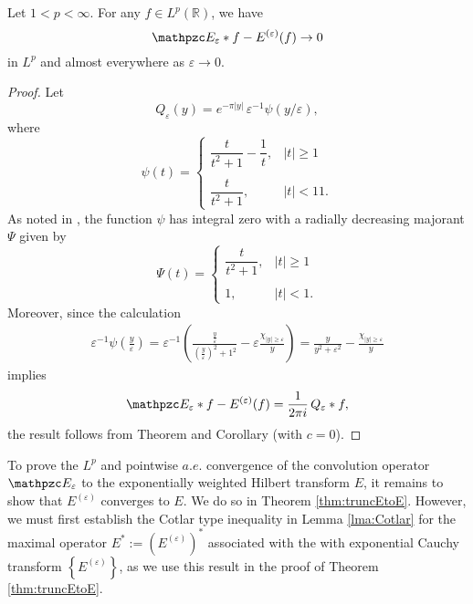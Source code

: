 \documentclass[../dissertation.tex]{subfiles}
\begin{document}
\begin{thm} \label{thm:TruncEepsEquivLim}
	Let $1 < p < \infty$. For any $f \in L^p(\mathbb R)$, we have 
	\[
		\mathpzc E_\varepsilon * f - E^{(\varepsilon)}(f) \to 0
	\]
	in $L^p$ and almost everywhere as $\varepsilon \to 0$. 
\end{thm}
\begin{proof}
	Let
	\[
		Q_\varepsilon(y) = e^{-\pi|y|} \, \varepsilon^{-1} \psi(y/\varepsilon),
	\]
	where 
	\[
		\psi(t) =
			\begin{cases}
				\dfrac{t}{t^2 + 1} - \dfrac{1}{t}, & |t| \geq 1 \\ \\
				\dfrac{t}{t^2 + 1},                & |t| < 1 1.   
			\end{cases}
	\]
	As noted in \cite{Grafakos}, the function $\psi$ has integral zero with 
	a radially decreasing majorant $\Psi$ given by 
	\[
		\Psi(t) =
			\begin{cases}
				\dfrac{t}{t^2 + 1}, & |t| \geq 1 \\ \\
				1,                  & |t| < 1.   
			\end{cases}	
	\]
	Moreover, since the calculation
	\begin{align*}
		\varepsilon^{-1} \psi\left(\frac{y}{\varepsilon}\right)
			= \varepsilon^{-1}
				\left(
					\frac{\frac{y}{\varepsilon}}
						{\left(\frac{y}{\varepsilon}\right)^2+1^2}
					- \varepsilon\frac{\chi_{|y|\geq \varepsilon}}{y}
				\right)
			= \frac{y}{y^2+\varepsilon^2} - \frac{\chi_{|y|\geq \varepsilon}}{y}
	\end{align*}
	implies 
	\[
		\mathpzc E_\varepsilon * f - E^{(\varepsilon)}(f) 
			= \frac{1}{2\pi i}\,Q_\varepsilon * f,
	\]
	the result follows from Theorem \cite[Theorem 1.2.21]{Grafakos} and Corollary 
	\cite[Corollary 2.1.19]{Grafakos} (with $c = 0$).
\end{proof}

To prove the $L^p$ and pointwise $a.e.$ convergence of the convolution operator 
$\mathpzc E_\varepsilon$ to the exponentially weighted Hilbert transform $E$, 
it remains to show that $E^{(\varepsilon)}$ converges to $E$. We do so 
in Theorem \ref{thm:truncEtoE}. However, we must first establish the Cotlar
type inequality in Lemma \ref{lma:Cotlar} for the maximal operator
$E^*:= \left( E^{(\varepsilon)} \right)^*$\label{sym:maxCauchyT} associated with 
the with exponential Cauchy transform $\left\{ E^{(\varepsilon)}\right\}$, as we 
use this result in the proof
of Theorem \ref{thm:truncEtoE}.
\end{document}
